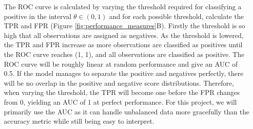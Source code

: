 The ROC curve is calculated by varying the threshold required for classifying a positive in the interval $\theta \in (0,1)$ and for each possible threshold, calculate the TPR and FPR (Figure \ref{fig:performance_measures}B). Firstly the threshold is so high that all observations are assigned as negatives. As the threshold is lowered, the TPR and FPR increase as more observations are classified as positives until the ROC curve reaches (1, 1), and all observations are classified as positive. The ROC curve will be roughly linear at random performance and give an AUC of 0.5. If the model manages to separate the positive and negatives perfectly, there will be no overlap in the positive and negative score distributions. Therefore, when varying the threshold, the TPR will become one before the FPR changes from 0, yielding an AUC of 1 at perfect performance. For this project, we will primarily use the AUC as it can handle unbalanced data more gracefully than the accuracy metric while still being easy to interpret.

